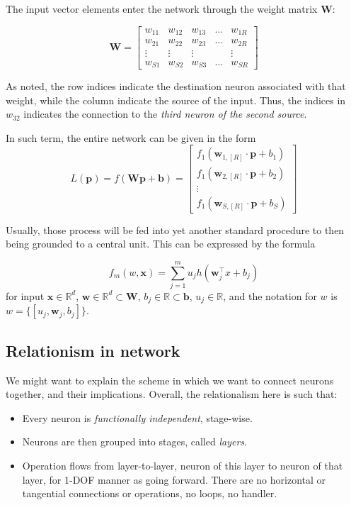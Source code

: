 The input vector elements enter the network through the weight matrix $\mathbf{W}$: 

$$\mathbf{W}=\begin{bmatrix}
w_{11}  & w_{12} & w_{13}  & \dots & w_{1R} \\
w_{21} & w_{22}  & w_{23} & \dots & w_{2R} \\
\vdots & \vdots & \vdots &  & \vdots \\
w_{S1} & w_{S2} & w_{S3} & \dots & w_{SR}
\end{bmatrix}$$

As noted, the row indices indicate the destination neuron associated with that weight, while the column indicate the source of the input. Thus, the indices in $w_{32}$ indicates the connection to the \textit{third neuron of the second source}.

In such term, the entire network can be given in the form \begin{equation*}
    L(\mathbf{p}) = f(\mathbf{Wp}+ \mathbf{b}) = \begin{bmatrix}
        f_{1}(\mathbf{w}_{1,[R]}\cdot \mathbf{p} + b_1)\\
        f_{1}(\mathbf{w}_{2,[R]}\cdot \mathbf{p} + b_2) \\
        \vdots \\
        f_{1}(\mathbf{w}_{S,[R]}\cdot \mathbf{p} + b_S)
    \end{bmatrix}
\end{equation*}

Usually, those process will be fed into yet another standard procedure to then being grounded to a central unit. This can be expressed by the formula 

\begin{equation}
    f_{m}(w,\mathbf{x}) = \sum^{m}_{j=1} u_{j} h(\mathbf{w}_{j}^{\top}x + b_{j})
\end{equation}
for input $\mathbf{x}\in \mathbb{R}^{d}$, $\mathbf{w}\in \mathbb{R}^{d}\subset \mathbf{W}$, $b_{j}\in \mathbb{R}\subset \mathbf{b}$, $u_{j}\in \mathbb{R}$, and the notation for $w$ is $w=\{[u_j, \mathbf{w}_{j},b_{j}]\}$. 

\subsection{Relationism in network}
We might want to explain the scheme in which we want to connect neurons together, and their implications. Overall, the relationalism here is such that: 
\begin{itemize}
    \item Every neuron is \textit{functionally independent}, stage-wise. 
    \item Neurons are then grouped into stages, called \textit{layers}. 
    \item Operation flows from layer-to-layer, neuron of this layer to neuron of that layer, for 1-DOF manner as going forward. There are no horizontal or tangential connections or operations, no loops, no handler.  
\end{itemize}

